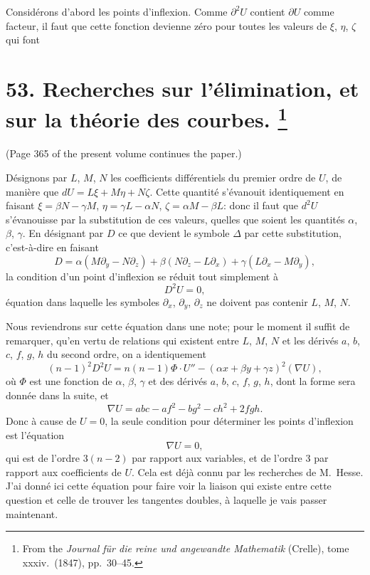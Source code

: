\documentclass[11pt,a4paper]{book}
\begin{document}
Consid\'erons d'abord les points d'inflexion. Comme $\partial^2 U$ contient $\partial U$ comme facteur, il faut que cette fonction devienne z\'ero pour toutes les valeurs de $\xi$, $\eta$, $\zeta$ qui font
\clearpage


\newpage


\section[Researches on Elimination, and on the Theory of Curves]{%
53. Recherches sur l'\'{e}limination, et sur la th\'{e}orie des courbes.%
\footnote{From the \textit{Journal f\"{u}r die reine und angewandte Mathematik} (Crelle), tome xxxiv.\ (1847), pp.~30--45.}}

(Page 365 of the present volume continues the paper.)

D\'{e}signons par $L$, $M$, $N$ les coefficients diff\'{e}rentiels du premier ordre de
$U$, de mani\`{e}re que $dU = L\xi + M\eta + N\zeta$.
Cette quantit\'{e} s'\'{e}vanouit identiquement en faisant
$\xi = \beta N - \gamma M$, $\eta = \gamma L - \alpha N$, $\zeta = \alpha M - \beta L$:
donc il faut que $d^2U$ s'\'{e}vanouisse par la substitution de ces valeurs,
quelles que soient les quantit\'{e}s $\alpha$, $\beta$, $\gamma$.
En d\'{e}signant par $D$ ce que devient le symbole $\Delta$ par cette substitution,
c'est-\`{a}-dire en faisant
\[
D = \alpha(M\partial_y - N\partial_z) + \beta(N\partial_z - L\partial_x) + \gamma(L\partial_x - M\partial_y),
\]
la condition d'un point d'inflexion se r\'{e}duit tout simplement \`{a}
\[
D^2U = 0,
\]
\'{e}quation dans laquelle les symboles $\partial_x$, $\partial_y$, $\partial_z$ ne doivent pas contenir
$L$, $M$, $N$.

Nous reviendrons sur cette \'{e}quation dans une note; pour le moment il suffit de remarquer,
qu'en vertu de relations qui existent entre $L$, $M$, $N$ et les d\'{e}riv\'{e}s
$a$, $b$, $c$, $f$, $g$, $h$ du second ordre, on a identiquement
\[
(n-1)^2 D^2U = n(n-1)\Phi \cdot U'' - (\alpha x + \beta y + \gamma z)^2 (\nabla U),
\]
o\`{u} $\Phi$ est une fonction de $\alpha$, $\beta$, $\gamma$ et des d\'{e}riv\'{e}s
$a$, $b$, $c$, $f$, $g$, $h$, dont la forme sera donn\'{e}e dans la suite, et
\[
\nabla U = abc - af^2 - bg^2 - ch^2 + 2fgh.
\]
Donc \`{a} cause de $U = 0$, la seule condition pour d\'{e}terminer les points d'inflexion est
l'\'{e}quation
\[
\nabla U = 0,
\]
qui est de l'ordre $3(n-2)$ par rapport aux variables, et de l'ordre 3 par rapport aux
coefficients de $U$. Cela est d\'{e}j\`{a} connu par les recherches de M.~Hesse.
J'ai donn\'{e} ici cette \'{e}quation pour faire voir la liaison qui existe entre cette question
et celle de trouver les tangentes doubles, \`{a} laquelle je vais passer maintenant.
\end{document}
